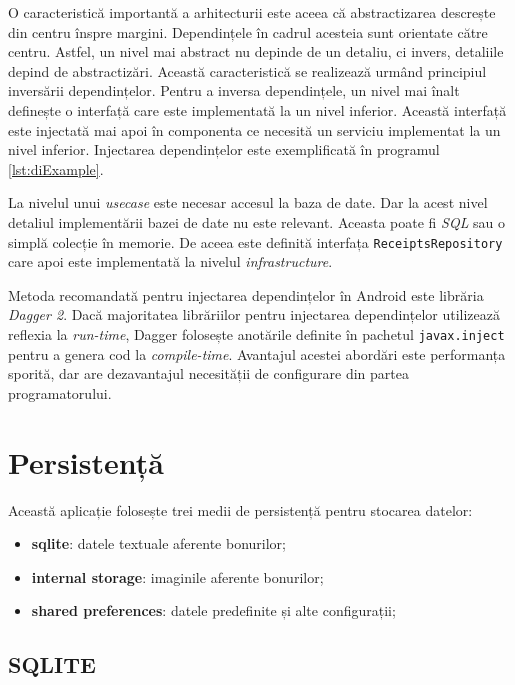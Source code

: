 O caracteristică importantă a arhitecturii este aceea că abstractizarea descrește din centru înspre margini. Dependințele în cadrul acesteia sunt orientate către centru. Astfel, un nivel mai abstract nu depinde de un detaliu, ci invers, detaliile depind de abstractizări. Această caracteristică se realizează urmând principiul inversării dependințelor. Pentru a inversa dependințele, un nivel mai înalt definește o interfață care este implementată la un nivel inferior. Această interfață este injectată mai apoi în componenta ce necesită un serviciu implementat la un nivel inferior. Injectarea dependințelor este exemplificată în programul \ref{lst:diExample}.



La nivelul unui \emph{usecase} este necesar accesul la baza de date. Dar la acest nivel detaliul implementării bazei de date nu este relevant. Aceasta poate fi \emph{SQL} sau o simplă colecție în memorie. De aceea este definită interfața \texttt{ReceiptsRepository} care apoi este implementată la nivelul \emph{infrastructure}.

Metoda recomandată pentru injectarea dependințelor în Android este librăria \emph{Dagger 2}. Dacă majoritatea librăriilor pentru injectarea dependințelor utilizează reflexia la \emph{run-time}, Dagger folosește anotările definite în pachetul \texttt{javax.inject} pentru a genera cod la \emph{compile-time}. Avantajul acestei abordări este performanța sporită, dar are dezavantajul necesității de configurare din partea programatorului.

\section{Persistență}

Această aplicație folosește trei medii de persistență pentru stocarea datelor:

\begin{itemize}
\item
  \textbf{sqlite}: datele textuale aferente bonurilor;
\item
  \textbf{internal storage}: imaginile aferente bonurilor;
\item
  \textbf{shared preferences}: datele predefinite și alte configurații;
\end{itemize}

\subsection{SQLITE}\label{sqlite}

